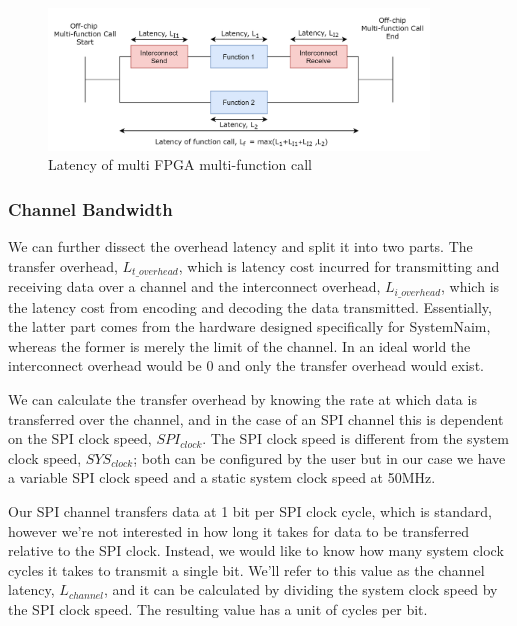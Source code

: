 \begin{figure}[!htb]
    \centering
    \includegraphics[width=0.9\textwidth]{05_evaluation/images/offchip_latency.png}
    \caption{Latency of multi FPGA multi-function call}
    \label{fig:multi_fpga_call}
\end{figure}

\subsubsection{Channel Bandwidth}
 
We can further dissect the overhead latency and split it into two parts. The transfer overhead, $L_{t\_overhead}$, which is latency cost incurred for transmitting and receiving data over a channel and the interconnect overhead, $L_{i\_overhead}$, which is the latency cost from encoding and decoding the data transmitted. Essentially, the latter part comes from the hardware designed specifically for SystemNaim, whereas the former is merely the limit of the channel. In an ideal world the interconnect overhead would be 0 and only the transfer overhead would exist. 

We can calculate the transfer overhead by knowing the rate at which data is transferred over the channel, and in the case of an SPI channel this is dependent on the SPI clock speed, $\mathit{SPI}_{clock}$. The SPI clock speed is different from the system clock speed, $\mathit{SYS}_{clock}$; both can be configured by the user but in our case we have a variable SPI clock speed and a static system clock speed at 50MHz.

Our SPI channel transfers data at 1 bit per SPI clock cycle, which is standard, however we're not interested in how long it takes for data to be transferred relative to the SPI clock. Instead, we would like to know how many system clock cycles it takes to transmit a single bit. We'll refer to this value as the channel latency, $L_{channel}$, and it can be calculated by dividing the system clock speed by the SPI clock speed. The resulting value has a unit of cycles per bit.

